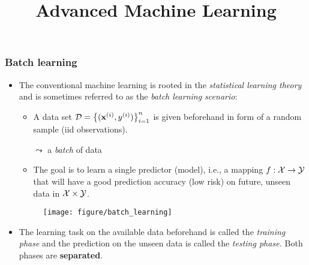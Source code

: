 \documentclass[11pt,compress,t,notes=noshow, xcolor=table]{beamer}
\title{Advanced Machine Learning}
\date{}
\begin{document}



\sloppy

\begin{frame} [t]
	\frametitle{Batch learning}
	\small
	\begin{itemize} 
			  \item The conventional machine learning is rooted in the \emph{statistical learning theory} and is sometimes referred to as the \emph{batch learning scenario}:	
			  \lz
			  
%			
			\begin{minipage}{.6\textwidth}
			\begin{itemize}\small
%				
				  \item A data set $\mathcal{D} = \big\{(\mathbf{x}^{(i)},y^{(i)})\big\}_{i=1}^n $   is given beforehand in form of a random sample (iid observations).
%				  
				  \pause
				  \item [$\leadsto$] a \emph{batch} of data
%				  
				  \item The goal is to learn a single predictor (model), i.e., a mapping $f:\mathcal{X} \to \mathcal{Y}$ that will have a good prediction accuracy (low risk) on future, unseen data in $\mathcal{X} \times \mathcal{Y}$. 
%				  
				\pause
			\end{itemize}
		\end{minipage}
		\begin{minipage}{.3\textwidth}
			\begin{figure}
				\centering
				\texttt{[image: figure/batch\_learning]}
			\end{figure}
		\end{minipage}
		\lz
		  \item The learning task on the available data beforehand is called the \emph{training phase} and the prediction on the unseen data is called the \emph{testing phase.} Both phases are \textbf{separated}.
	\end{itemize}
\end{frame}
\end{document}
